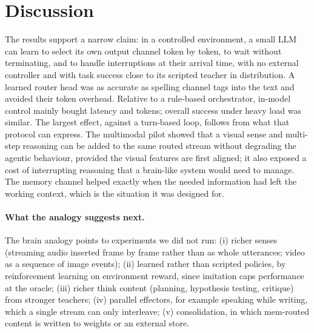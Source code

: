 \documentclass[10pt]{article}
\begin{document}
\section{Discussion}
The results support a narrow claim: in a controlled environment, a small LLM can learn to select its own output channel token by token, to wait without terminating, and to handle interruptions at their arrival time, with no external controller and with task success close to its scripted teacher in distribution. A learned router head was as accurate as spelling channel tags into the text and avoided their token overhead. Relative to a rule-based orchestrator, in-model control mainly bought latency and tokens; overall success under heavy load was similar. The largest effect, against a turn-based loop, follows from what that protocol can express. The multimodal pilot showed that a visual sense and multi-step reasoning can be added to the same routed stream without degrading the agentic behaviour, provided the visual features are first aligned; it also exposed a cost of interrupting reasoning that a brain-like system would need to manage. The memory channel helped exactly when the needed information had left the working context, which is the situation it was designed for.

\paragraph{What the analogy suggests next.} The brain analogy points to experiments we did not run: (i) richer senses (streaming audio inserted frame by frame rather than as whole utterances; video as a sequence of image events); (ii) learned rather than scripted policies, by reinforcement learning on environment reward, since imitation caps performance at the oracle; (iii) richer think content (planning, hypothesis testing, critique) from stronger teachers; (iv) parallel effectors, for example speaking while writing, which a single stream can only interleave; (v) consolidation, in which mem-routed content is written to weights or an external store.
\end{document}
